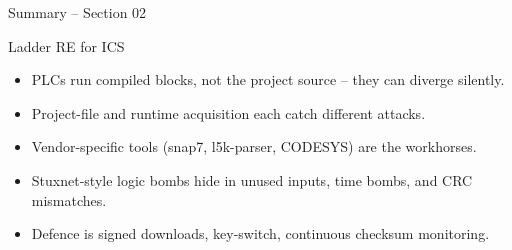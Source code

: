 \documentclass[aspectratio=169,11pt]{beamer}
\def\sectionNumber{02}
\begin{document}
\begin{frame}{Summary -- Section \sectionNumber}
\begin{takeawaybox}{Ladder RE for ICS}
\begin{itemize}\setlength{\itemsep}{2pt}
  \item PLCs run compiled blocks, not the project source -- they can diverge silently.
  \item Project-file and runtime acquisition each catch different attacks.
  \item Vendor-specific tools (snap7, l5k-parser, CODESYS) are the workhorses.
  \item Stuxnet-style logic bombs hide in unused inputs, time bombs, and CRC mismatches.
  \item Defence is signed downloads, key-switch, continuous checksum monitoring.
\end{itemize}
\end{takeawaybox}
\end{frame}
\end{document}
